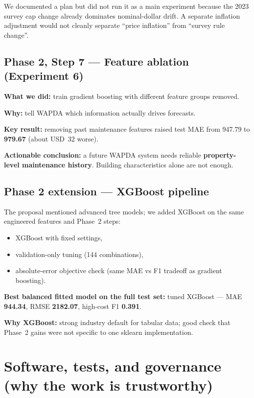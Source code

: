 \documentclass[11pt,a4paper]{article}
\begin{document}
We documented a plan but did not run it as a main experiment because the 2023 survey cap change already dominates nominal-dollar drift. A separate inflation adjustment would not cleanly separate ``price inflation'' from ``survey rule change''.

\subsection{Phase 2, Step 7 --- Feature ablation (Experiment 6)}

\textbf{What we did:} train gradient boosting with different feature groups removed.

\textbf{Why:} tell WAPDA which information actually drives forecasts.

\textbf{Key result:} removing past maintenance features raised test MAE from 947.79 to \textbf{979.67} (about USD~32 worse).

\textbf{Actionable conclusion:} a future WAPDA system needs reliable \textbf{property-level maintenance history}. Building characteristics alone are not enough.

\subsection{Phase 2 extension --- XGBoost pipeline}

The proposal mentioned advanced tree models; we added XGBoost on the same engineered features and Phase~2 steps:
\begin{itemize}
  \item XGBoost with fixed settings,
  \item validation-only tuning (144 combinations),
  \item absolute-error objective check (same MAE vs F1 tradeoff as gradient boosting).
\end{itemize}

\textbf{Best balanced fitted model on the full test set:} tuned XGBoost --- MAE \textbf{944.34}, RMSE \textbf{2182.07}, high-cost F1 \textbf{0.391}.

\textbf{Why XGBoost:} strong industry default for tabular data; good check that Phase~2 gains were not specific to one sklearn implementation.

\section{Software, tests, and governance (why the work is trustworthy)}
\end{document}
